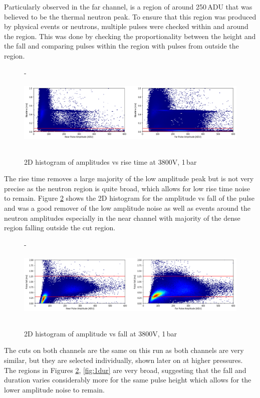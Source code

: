 \documentclass[a4paper]{article}
\begin{document}
\newline Particularly observed in the far channel, is a region of around 250\,ADU that was believed to be the thermal neutron peak. To ensure that this region was produced by physical events or neutrons, multiple pulses were checked within and around the region. This was done by checking the proportionality between the height and the fall and comparing pulses within the region with pulses from outside the region.
\begin{figure}[H]-
    \centering
    \includegraphics[height=3.7cm]{plots/uk24n001_rise.png}
    \caption{2D histogram of amplitudes vs rise time at 3800V, 1\,bar}
    \label{fig:1rise}
\end{figure}
\noindent The rise time removes a large majority of the low amplitude peak but is not very precise as the neutron region is quite broad, which allows for low rise time noise to remain. Figure \ref{fig:1fall} shows the 2D histogram for the amplitude vs fall of the pulse and was a good remover of the low amplitude noise as well as events around the neutron amplitudes especially in the near channel with majority of the dense region falling outside the cut region.
\begin{figure}[H]-
    \centering
    \includegraphics[height=3.7cm]{plots/uk24n001_fall.png}
    \caption{2D histogram of amplitude vs fall at 3800V, 1\,bar}
    \label{fig:1fall}
\end{figure}
\noindent The cuts on both channels are the same on this run as both channels are very similar, but they are selected individually, shown later on at higher pressures. The regions in Figures \ref{fig:1fall}, \ref{fig:1dur} are very broad, suggesting that the fall and duration varies considerably more for the same pulse height which allows for the lower amplitude noise to remain.
\end{document}
